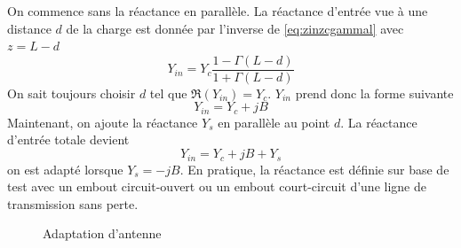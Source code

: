 On commence sans la réactance en parallèle. La réactance d'entrée vue à une distance $d$ de la charge est donnée par l'inverse de \eqref{eq:zinzcgammal} avec $z=L-d$
\begin{equation}
	Y_{in}=Y_c \frac{1-\Gamma(L-d)}{1+\Gamma(L-d)}
\end{equation}
On sait toujours choisir $d$ tel que $\Re(Y_{in})=Y_c$. $Y_{in}$ prend donc la forme suivante
\begin{equation}
	Y_{in} = Y_c+jB
\end{equation}
Maintenant, on ajoute la réactance $Y_s$ en parallèle au point $d$. La réactance d'entrée totale devient
\begin{equation}
	Y_{in} = Y_c + jB+ Y_s
\end{equation}
on est adapté lorsque $Y_s = -jB$. En pratique, la réactance est définie sur base de test avec un embout circuit-ouvert ou un embout court-circuit d'une ligne de transmission sans perte.
\begin{figure}[H] 
	\centering
	\caption{Adaptation d'antenne} 
\end{figure}
	
	
	
	
	
	
	
	
	
	
	
	
	
	
	
	
	



